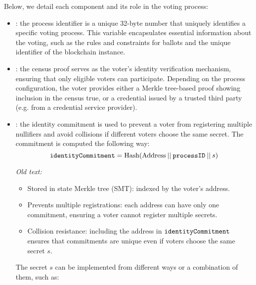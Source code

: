 Below, we detail each component and its role in the voting process:
\begin{itemize}
	\item \processid: the process identifier is a unique 32-byte number that uniquely identifies a specific voting process. This variable encapsulates essential information about the voting, such as the rules and constraints for ballots and the unique identifier of the \davinci blockchain instance.
	\item \censuspf: the census proof serves as the voter's identity verification mechanism, ensuring that only eligible voters can participate. Depending on the process configuration, the voter provides either a Merkle tree-based proof showing inclusion in the census true, or a credential issued by a trusted third party (e.g. from a credential service provider).
	\item \commitment: the identity commitment is used to prevent a voter from registering multiple nullifiers and avoid collisions if different voters choose the same secret. The commitment is computed the following way:
	\[ \texttt{identityCommitment} = \text{Hash}(\text{Address} \:||\: \texttt{processID} \:||\: s)\]
	{\it Old text:
	\begin{itemize}
		\item Stored in state Merkle tree (SMT): indexed by the voter's address.
		\item Prevents multiple registrations: each address can have only one commitment, ensuring a voter cannot register multiple secrets.
		\item Collision resistance: including the address in $\texttt{identityCommitment}$ ensures that commitments are unique even if voters choose the same secret $s$.
	\end{itemize}
	
	The secret $s$ can be implemented from different ways or a combination of them, such as:
	
}
\end{itemize}
